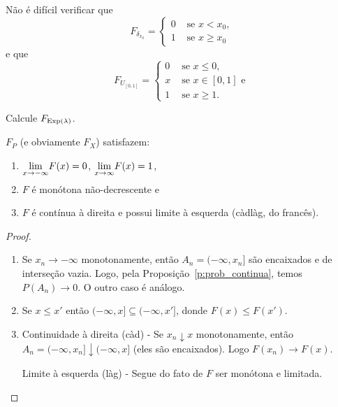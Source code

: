 \begin{example}
  Não é difícil verificar que
  \begin{equation}
    F_{\delta_{x_0}} =
    \begin{cases}
      0 & \text{ se $x < x_0$,}\\
      1 & \text{ se $x \geq x_0$}
    \end{cases}
  \end{equation}
  e que
  \begin{equation}
    F_{U_{[0,1]}} =
    \begin{cases}
      0 & \text{ se $x \leq 0$,}\\
      x & \text{ se $x \in [0,1]$ e}\\
      1 & \text{ se $x \geq 1$.}
    \end{cases}
  \end{equation}
\end{example}

\begin{exercise}
  Calcule $F_{\operatorname{Exp}(\lambda)}$.
\end{exercise}

\begin{proposition}
  \label{p:propried_F}
  $F_P$ (e obviamente $F_X$) satisfazem:
  \begin{enumerate}[\quad a)]
  \item $\smash{\lim\limits_{x \to -\infty}} F(x) = 0$, $\smash{\lim\limits_{x \to \infty}} F(x) = 1$,
  \item $F$ é monótona não-decrescente e
  \item $F$ é contínua à direita e possui limite à esquerda (càdlàg, do francês). 
  \end{enumerate}
\end{proposition}

\begin{proof}
  \begin{enumerate}[\quad a)]
  \item Se $x_n \to -\infty$ monotonamente, então $A_n = (-\infty, x_n]$ são encaixados e de interseção vazia.
    Logo, pela Proposição~\ref{p:prob_continua}, temos $P(A_n) \to 0$.
    O outro caso é análogo.
  \item Se $x \leq x'$ então $(-\infty, x] \subseteq (-\infty,x']$, donde $F(x) \leq F(x')$.
  \item Continuidade à direita (càd) - Se $x_n \downarrow x$ monotonamente, então $A_n = (-\infty, x_n] \downarrow (-\infty, x]$ (eles são encaixados).
    Logo $F(x_n) \to F(x)$.

    Limite à esquerda (làg) - Segue do fato de $F$ ser monótona e limitada. \qedhere
  \end{enumerate}
\end{proof}

